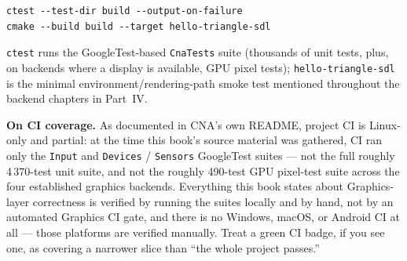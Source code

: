 \begin{lstlisting}[style=cnashell]
ctest --test-dir build --output-on-failure
cmake --build build --target hello-triangle-sdl
\end{lstlisting}

\texttt{ctest} runs the GoogleTest-based \texttt{CnaTests} suite (thousands of unit tests,
plus, on backends where a display is available, GPU pixel tests); \texttt{hello-triangle-sdl}
is the minimal environment/rendering-path smoke test mentioned throughout the backend chapters
in Part~IV.

\begin{sourcenote}
\textbf{On CI coverage.} As documented in CNA's own README, project CI is Linux-only and
partial: at the time this book's source material was gathered, CI ran only the
\texttt{Input} and \texttt{Devices} / \texttt{Sensors} GoogleTest suites --- not the full
roughly 4\,370-test unit suite, and not the roughly 490-test GPU pixel-test suite across the
four established graphics backends. Everything this book states about Graphics-layer
correctness is verified by running the suites locally and by hand, not by an automated
Graphics CI gate, and there is no Windows, macOS, or Android CI at all --- those platforms
are verified manually. Treat a green CI badge, if you see one, as covering a narrower slice
than ``the whole project passes.''
\end{sourcenote}
